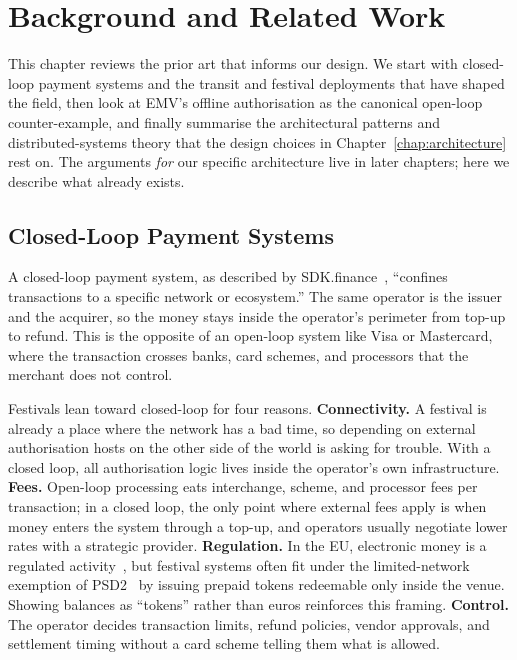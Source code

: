 \chapter{Background and Related Work}
\label{chap:background}

This chapter reviews the prior art that informs our design. We start with closed-loop payment systems and the transit and festival deployments that have shaped the field, then look at EMV's offline authorisation as the canonical open-loop counter-example, and finally summarise the architectural patterns and distributed-systems theory that the design choices in Chapter~\ref{chap:architecture} rest on. The arguments \emph{for} our specific architecture live in later chapters; here we describe what already exists.

\section{Closed-Loop Payment Systems}
\label{sec:closed-loop}

A closed-loop payment system, as described by SDK.finance~\cite{SDKFinance2024}, ``confines transactions to a specific network or ecosystem.'' The same operator is the issuer and the acquirer, so the money stays inside the operator's perimeter from top-up to refund. This is the opposite of an open-loop system like Visa or Mastercard, where the transaction crosses banks, card schemes, and processors that the merchant does not control.

Festivals lean toward closed-loop for four reasons. \textbf{Connectivity.} A festival is already a place where the network has a bad time, so depending on external authorisation hosts on the other side of the world is asking for trouble. With a closed loop, all authorisation logic lives inside the operator's own infrastructure. \textbf{Fees.} Open-loop processing eats interchange, scheme, and processor fees per transaction; in a closed loop, the only point where external fees apply is when money enters the system through a top-up, and operators usually negotiate lower rates with a strategic provider. \textbf{Regulation.} In the EU, electronic money is a regulated activity~\cite{EMD2009}, but festival systems often fit under the limited-network exemption of PSD2~\cite{PSD2015} by issuing prepaid tokens redeemable only inside the venue. Showing balances as ``tokens'' rather than euros reinforces this framing. \textbf{Control.} The operator decides transaction limits, refund policies, vendor approvals, and settlement timing without a card scheme telling them what is allowed.

